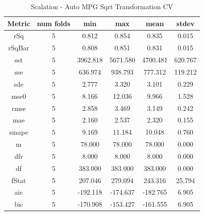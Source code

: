 \documentclass{article}
\begin{document}
\begin{table}[H]
\centering
\caption{Scalation - Auto MPG Sqrt Transformation CV}
\label{tab:Scalation - Auto MPG Sqrt Transformation CV}
\begin{tabular}{|c|c|c|c|c|c|}\hline
Metric & num folds & min & max & mean & stdev \\ \hline \hline
rSq & 5 & 0.812 & 0.854 & 0.835 & 0.015 \\ \hline
rSqBar & 5 & 0.808 & 0.851 & 0.831 & 0.015 \\ \hline
sst & 5 & 3962.818 & 5671.580 & 4700.481 & 620.767 \\ \hline
sse & 5 & 636.974 & 938.793 & 777.312 & 119.212 \\ \hline
sde & 5 & 2.777 & 3.320 & 3.101 & 0.229 \\ \hline
mse0 & 5 & 8.166 & 12.036 & 9.966 & 1.528 \\ \hline
rmse & 5 & 2.858 & 3.469 & 3.149 & 0.242 \\ \hline
mae & 5 & 2.160 & 2.537 & 2.320 & 0.155 \\ \hline
smape & 5 & 9.169 & 11.184 & 10.048 & 0.760 \\ \hline
m & 5 & 78.000 & 78.000 & 78.000 & 0.000 \\ \hline
dfr & 5 & 8.000 & 8.000 & 8.000 & 0.000 \\ \hline
df & 5 & 383.000 & 383.000 & 383.000 & 0.000 \\ \hline
fStat & 5 & 207.046 & 279.094 & 243.316 & 25.794 \\ \hline
aic & 5 & -192.118 & -174.637 & -182.765 & 6.905 \\ \hline
bic & 5 & -170.908 & -153.427 & -161.555 & 6.905 \\ \hline
\end{tabular}
\end{table}
\end{document}
